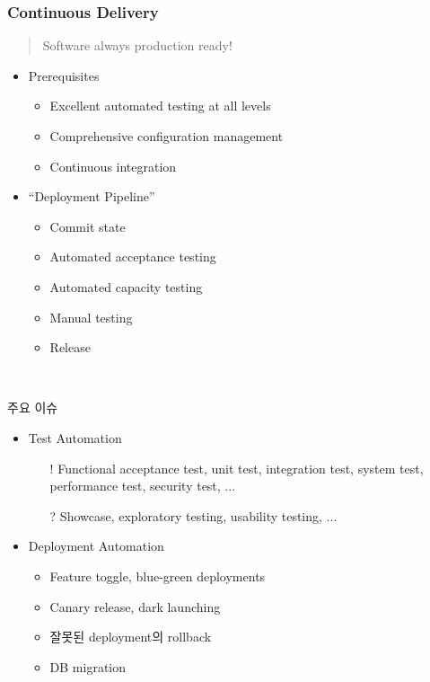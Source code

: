 \begin{frame}[allowframebreaks]
\frametitle{Continuous Delivery}

\begin{quote}
Software always production ready!
\end{quote}

\begin{itemize}
  \item Prerequisites 
  \begin{itemize}
  \item Excellent automated testing at all levels
  \item Comprehensive configuration management
  \item Continuous integration
  \end{itemize}

  \item ``Deployment Pipeline''
  \begin{itemize}
  \item Commit state
  \item Automated acceptance testing
  \item Automated capacity testing
  \item Manual testing
  \item Release
  \end{itemize}
\end{itemize}

\pagebreak

\mbox{ }
\medskip

주요 이슈
 
\begin{itemize}
\item Test Automation
  \begin{itemize}
  \item[!] Functional acceptance test, unit test, integration test,
    system test, performance test, security test, ...
  \item[?] Showcase, exploratory testing, usability testing, ...
  \end{itemize}
\item Deployment Automation
  \begin{itemize}
  \item Feature toggle, blue-green deployments
  \item Canary release, dark launching
  \item 잘못된 deployment의 rollback
  \item DB migration %
  \end{itemize}
\end{itemize}


\end{frame}
